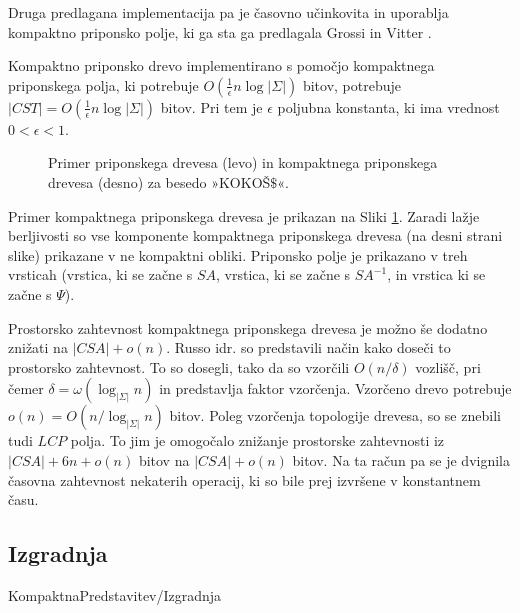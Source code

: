 Druga predlagana implementacija pa je časovno učinkovita in uporablja kompaktno priponsko polje, ki ga sta ga predlagala Grossi in Vitter \cite{Grossi2000}. 
\begin{posl}\label{pos:CSAlog}
Kompaktno priponsko drevo implementirano s pomočjo kompaktnega priponskega polja, ki potrebuje $O(\frac{1}{\epsilon}n\log{| \Sigma|})$ bitov, potrebuje $|CST|=O(\frac{1}{\epsilon}n\log{| \Sigma|})$ bitov. Pri tem je $\epsilon$ poljubna konstanta, ki ima vrednost $0<\epsilon<1$.
\end{posl}

\begin{figure}[tb]
    \begin{center}
        
        \caption{Primer priponskega drevesa (levo) in kompaktnega priponskega drevesa (desno) za besedo »KOKOŠ$\$$«.} 
        \label{fig:CST}
    \end{center}
\end{figure}

Primer kompaktnega priponskega drevesa je prikazan na Sliki \ref{fig:CST}. Zaradi lažje berljivosti so vse komponente kompaktnega priponskega drevesa (na desni strani slike) prikazane v ne kompaktni obliki. Priponsko polje je prikazano v treh vrsticah (vrstica, ki se začne s $SA$, vrstica, ki se začne s $SA^{-1}$, in vrstica ki se začne s $\Psi$).

Prostorsko zahtevnost kompaktnega priponskega drevesa je možno še dodatno znižati na $|CSA|+o(n)$. Russo idr. \cite{Russo2008} so predstavili način kako doseči to prostorsko zahtevnost. To so dosegli, tako da so vzorčili $O(n/\delta)$ vozlišč, pri čemer $\delta=\omega(\log_{|\Sigma|}{n})$ in predstavlja faktor vzorčenja. Vzorčeno drevo potrebuje $o(n)=O(n/\log_{|\Sigma|}{n})$ bitov. Poleg vzorčenja topologije drevesa, so se znebili tudi $LCP$ polja. To jim je omogočalo znižanje prostorske zahtevnosti iz $|CSA|+6n+o(n)$ bitov na $|CSA|+o(n)$ bitov. Na ta račun pa se je dvignila časovna zahtevnost nekaterih operacij, ki so bile prej izvršene v konstantnem času.


\subsection{Izgradnja}\label{sec:CSTizgradnja}
{KompaktnaPredstavitev/Izgradnja}



